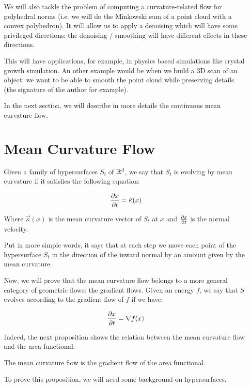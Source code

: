 We will also tackle the problem of computing a curvature-related flow for
polyhedral norms (i.e. we will do the Minkowski sum of a point cloud with a
convex polyhedron). It will allow us to apply a denoising which will have some
privileged directions: the denoising / smoothing will have different effects in
these directions.

This will have applications, for example, in physics based simulations like
crystal growth simulation.  An other example would be when we build a 3D scan of
an object: we want to be able to smooth the point cloud while preserving details
(the signature of the author for example).

In the next section, we will describe in more details the continuous mean
curvature flow.


\section{Mean Curvature Flow}

Given a family of hypersurfaces $ S_t $ of $ \mathbb{R}^d $, we say that $ S_t $ is
evolving by mean curvature if it satisfies the following equation:

$$ \frac{\partial{x}}{\partial{t}} = \vec{\kappa}(x) $$

Where $ \vec{\kappa}(x) $ is the mean curvature vector of $ S_t $ at $ x $ and
$ \frac{\partial{x}}{\partial{t}} $ is the normal velocity.

Put in more simple words, it says that at each step we move each point of the
hypersurface $ S_t $ in the direction of the inward normal by an amount given by
the mean curvature.

Now, we will prove that the mean curvature flow belongs to a more general
category of geometric flows: the gradient flows. Given an energy $ f $, we say
that $ S $ evolves according to the gradient flow of $ f $ if we have:

$$ \frac{\partial{x}}{\partial{t}} = \nabla f(x) $$

Indeed, the next proposition shows the relation between the mean curvature flow
and the area functional.

\begin{proposition}
    The mean curvature flow is the gradient flow of the area functional.
\end{proposition}

To prove this proposition, we will need some background on hypersurfaces.

